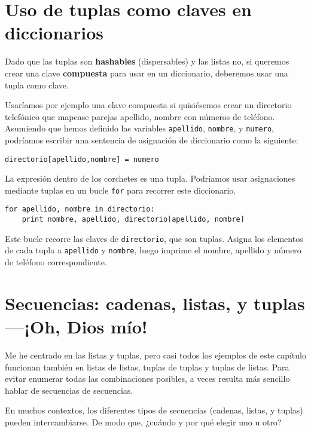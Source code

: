 \section{Uso de tuplas como claves en diccionarios}


Dado que las tuplas son {\bf hashables} (dispersables) y las listas no, si queremos
crear una clave {\bf compuesta} para usar en un diccionario, deberemos usar una tupla
como clave.

Usaríamos por ejemplo una clave compuesta si quisiésemos crear un
directorio telefónico que mapease
parejas apellido, nombre con números de teléfono. Asumiendo
que hemos definido las variables
{\tt apellido}, {\tt nombre}, y {\tt numero}, podríamos escribir
una sentencia de asignación de diccionario como la siguiente:

\beforeverb
\begin{verbatim}
directorio[apellido,nombre] = numero
\end{verbatim}
\afterverb
%
La expresión dentro de los corchetes es una tupla. Podríamos usar
asignaciones mediante tuplas en un bucle {\tt for} para recorrer este diccionario.


\beforeverb
\begin{verbatim}
for apellido, nombre in directorio:
    print nombre, apellido, directorio[apellido, nombre]
\end{verbatim}
\afterverb
%
Este bucle recorre las claves de {\tt directorio}, que son tuplas.
Asigna los elementos de cada tupla a {\tt apellido} y {\tt nombre}, luego
imprime el nombre, apellido y número de teléfono correspondiente.

\section{Secuencias: cadenas, listas, y tuplas---¡Oh, Dios mío!}

Me he centrado en las listas y tuplas, pero casi todos los ejemplos de
este capítulo funcionan también en listas de listas, tuplas de tuplas y
tuplas de listas. Para evitar enumerar todas las combinaciones posibles,
a veces resulta más sencillo hablar de secuencias de secuencias.

En muchos contextos, los diferentes tipos de secuencias (cadenas, listas, y
tuplas) pueden intercambiarse. De modo que, ¿cuándo y por qué elegir uno
u otro?

